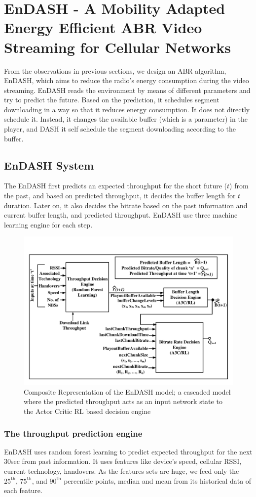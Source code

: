 \section{EnDASH - A Mobility Adapted Energy Efficient ABR Video Streaming for Cellular Networks}
From the observations in previous sections, we design an ABR algorithm, EnDASH, which aims to reduce the radio's energy consumption during the video streaming. EnDASH reads the environment by means of different parameters and try to predict the future. Based on the prediction, it schedules segment downloading in a way so that it reduces energy consumption. It does not directly schedule it. Instead, it changes the available buffer (which is a parameter) in the player, and DASH it self schedule the segment downloading according to the buffer.
\subsection{EnDASH System}
The EnDASH first predicts an expected throughput for the short future ($t$) from the past, and based on predicted throughput, it decides the buffer length for $t$ duration. Later on, it also decides the bitrate based on the past information and current buffer length, and predicted throughput. EnDASH use three machine learning engine for each step.

\begin{figure}[!h]
	\centering
	\includegraphics[width=0.7\linewidth]{img/EnDASH/EnDASH_system}
	\caption{Composite Representation of the EnDASH model; a cascaded model where the predicted throughput acts as an input network state to the Actor Critic RL based decision
engine}
	\label{fig:endash:system}
\end{figure}

\subsubsection{The throughput prediction engine}
EnDASH uses random forest learning to predict expected throughput for the next 30sec from past information. It uses features like device's speed, cellular RSSI, current technology, handovers. As the features sets are huge, we feed only the $\mathrm{25^{th}}$, $\mathrm{75^{th}}$, and $\mathrm{90^{th}}$ percentile points, median and mean from its historical data of each feature.
